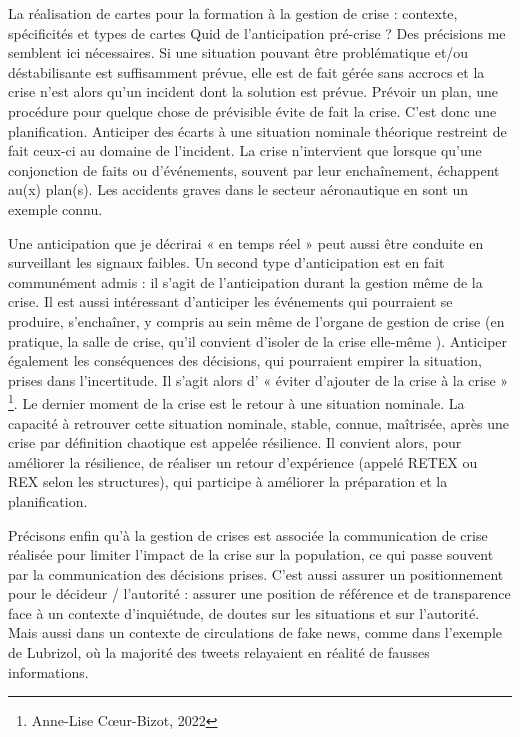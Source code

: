 \documentclass[10pt,a4paper]{report} %
\begin{document}
\begin{part}{La réalisation de cartes pour la formation à la gestion de crise : contexte, spécificités et types de cartes}
Quid de l’anticipation pré-crise ? Des précisions me semblent ici nécessaires. Si une situation pouvant être problématique et/ou déstabilisante est suffisamment prévue, elle est de fait gérée sans accrocs et la crise n’est alors qu’un incident dont la solution est prévue. Prévoir un plan, une procédure pour quelque chose de prévisible évite de fait la crise. C’est donc une planification. Anticiper des écarts à une situation nominale théorique restreint de fait ceux-ci au domaine de l’incident. La crise n’intervient que lorsque qu’une conjonction de faits ou d’événements, souvent par leur enchaînement, échappent au(x) plan(s). Les accidents graves dans le secteur aéronautique en sont un exemple connu. 

Une anticipation que je décrirai « en temps réel » peut aussi être conduite en surveillant les signaux faibles. Un second type d’anticipation est en fait communément admis : il s’agit de l’anticipation durant la gestion même de la crise. Il est aussi intéressant d’anticiper les événements qui pourraient se produire, s’enchaîner, y compris au sein même de l’organe de gestion de crise (en pratique, la salle de crise, qu’il convient d’isoler de la crise elle-même \parencite{lagadecGESTIONCRISES}). Anticiper également les conséquences des décisions, qui pourraient empirer la situation, prises dans l’incertitude. Il s’agit alors d’ « éviter d’ajouter de la crise à la crise » \footnote{Anne-Lise Cœur-Bizot, 2022}. Le dernier moment de la crise est le retour à une situation nominale. La capacité à retrouver cette situation nominale, stable, connue, maîtrisée, après une crise par définition chaotique est appelée résilience. Il convient alors, pour améliorer la résilience, de réaliser un retour d’expérience (appelé RETEX ou REX selon les structures), qui participe à améliorer la préparation et la planification.

Précisons enfin qu’à la gestion de crises est associée la communication de crise réalisée pour limiter l’impact de la crise sur la population, ce qui passe souvent par la communication des décisions prises. C’est aussi assurer un positionnement pour le décideur / l’autorité : assurer une position de référence et de transparence face à un contexte d’inquiétude, de doutes sur les situations et sur l’autorité. Mais aussi dans un contexte de circulations de fake news, comme dans l’exemple de Lubrizol, où la majorité des tweets relayaient en réalité de fausses informations. \parencite{a12h31IncendieUsineLubrizol2019}


\end{part}
\end{document}
